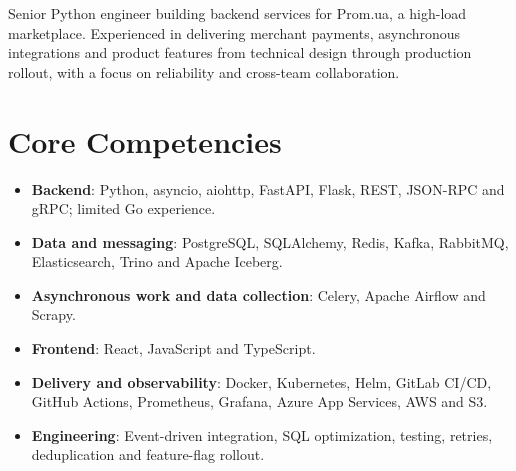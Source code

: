 \documentclass[11pt,a4paper,sans]{moderncv}
\begin{document}
\makecvtitle


\vspace{6pt}
\small{Senior Python engineer building backend services for Prom.ua, a high-load marketplace. Experienced in delivering merchant payments, asynchronous integrations and product features from technical design through production rollout, with a focus on reliability and cross-team collaboration.}

\section{Core Competencies}
\begin{itemize}
\item \textbf{Backend}: Python, asyncio, aiohttp, FastAPI, Flask, REST, JSON-RPC and gRPC; limited Go experience.
\item \textbf{Data and messaging}: PostgreSQL, SQLAlchemy, Redis, Kafka, RabbitMQ, Elasticsearch, Trino and Apache Iceberg.
\item \textbf{Asynchronous work and data collection}: Celery, Apache Airflow and Scrapy.
\item \textbf{Frontend}: React, JavaScript and TypeScript.
\item \textbf{Delivery and observability}: Docker, Kubernetes, Helm, GitLab CI/CD, GitHub Actions, Prometheus, Grafana, Azure App Services, AWS and S3.
\item \textbf{Engineering}: Event-driven integration, SQL optimization, testing, retries, deduplication and feature-flag rollout.
\end{itemize}
\end{document}
